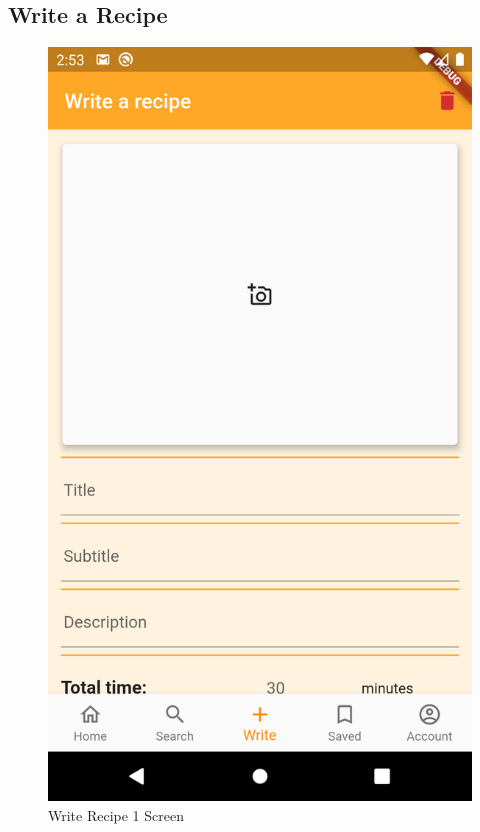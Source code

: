 \subsection{Write a Recipe}
\begin{figure}[H]
	\begin{minipage}{0.31\textwidth}
		\centering
		\includegraphics{img/Write_1.png}
		\caption{Write Recipe 1 Screen}
	\end{minipage}\hfill
	\begin{minipage}{0.31\textwidth}

\end{minipage}
\end{figure}
